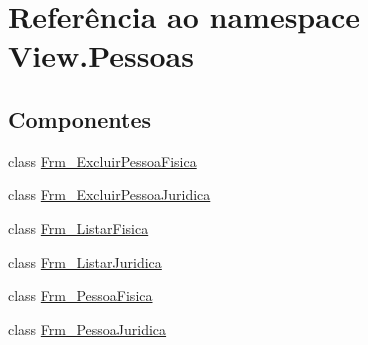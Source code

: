 \hypertarget{namespace_view_1_1_pessoas}{}\section{Referência ao namespace View.\+Pessoas}
\label{namespace_view_1_1_pessoas}
\subsection*{Componentes}
\begin{DoxyCompactItemize}
\item 
class \hyperlink{class_view_1_1_pessoas_1_1_frm___excluir_pessoa_fisica}{Frm\+\_\+\+Excluir\+Pessoa\+Fisica}
\item 
class \hyperlink{class_view_1_1_pessoas_1_1_frm___excluir_pessoa_juridica}{Frm\+\_\+\+Excluir\+Pessoa\+Juridica}
\item 
class \hyperlink{class_view_1_1_pessoas_1_1_frm___listar_fisica}{Frm\+\_\+\+Listar\+Fisica}
\item 
class \hyperlink{class_view_1_1_pessoas_1_1_frm___listar_juridica}{Frm\+\_\+\+Listar\+Juridica}
\item 
class \hyperlink{class_view_1_1_pessoas_1_1_frm___pessoa_fisica}{Frm\+\_\+\+Pessoa\+Fisica}
\item 
class \hyperlink{class_view_1_1_pessoas_1_1_frm___pessoa_juridica}{Frm\+\_\+\+Pessoa\+Juridica}
\end{DoxyCompactItemize}
